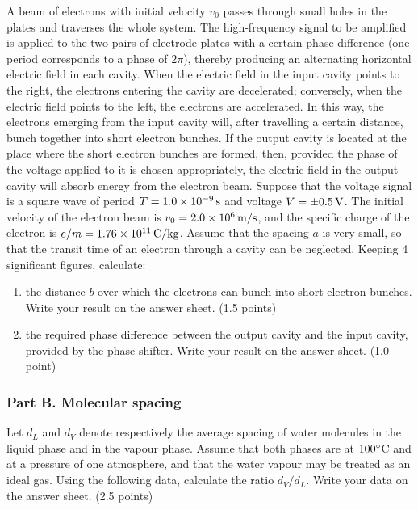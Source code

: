 A beam of electrons with initial velocity $v_0$ passes through small holes in the plates and traverses the whole system. The high-frequency signal to be amplified is applied to the two pairs of electrode plates with a certain phase difference (one period corresponds to a phase of $2\pi$), thereby producing an alternating horizontal electric field in each cavity. When the electric field in the input cavity points to the right, the electrons entering the cavity are decelerated; conversely, when the electric field points to the left, the electrons are accelerated. In this way, the electrons emerging from the input cavity will, after travelling a certain distance, bunch together into short electron bunches. If the output cavity is located at the place where the short electron bunches are formed, then, provided the phase of the voltage applied to it is chosen appropriately, the electric field in the output cavity will absorb energy from the electron beam. Suppose that the voltage signal is a square wave of period $T=1.0\times10^{-9}\,\mathrm{s}$ and voltage $V=\pm0.5\,\mathrm{V}$. The initial velocity of the electron beam is $v_0=2.0\times10^{6}\,\mathrm{m/s}$, and the specific charge of the electron is $e/m=1.76\times10^{11}\,\mathrm{C/kg}$. Assume that the spacing $a$ is very small, so that the transit time of an electron through a cavity can be neglected. Keeping 4 significant figures, calculate:

\begin{enumerate}
\item[(a)] the distance $b$ over which the electrons can bunch into short electron bunches. Write your result on the answer sheet. (1.5 points)
\item[(b)] the required phase difference between the output cavity and the input cavity, provided by the phase shifter. Write your result on the answer sheet. (1.0 point)
\end{enumerate}

\subsubsection*{Part B. Molecular spacing}

Let $d_L$ and $d_V$ denote respectively the average spacing of water molecules in the liquid phase and in the vapour phase. Assume that both phases are at $100^{\circ}$C and at a pressure of one atmosphere, and that the water vapour may be treated as an ideal gas. Using the following data, calculate the ratio $d_V/d_L$. Write your data on the answer sheet. (2.5 points)

